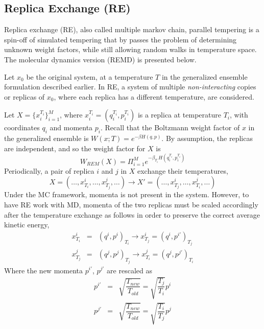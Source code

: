 \documentclass[12pt]{article}
\numberwithin{equation}{subsection}
\begin{document}
\begin{spacing}{1}
\subsection{Replica Exchange (RE)}
Replica exchange (RE), also called multiple markov chain, parallel tempering is a spin-off of simulated tempering that by passes the problem of determining unknown weight factors, while still allowing random walks in temperature space. The molecular dynamics version (REMD) is presented below.  

Let $x_0$ be the original system, at a temperature $T$ in the generalized ensemble formulation described earlier.  In RE, a system of multiple \textit{non-interacting} copies or replicas of $x_0$, where each replica has a different temperature, are considered. 

Let $X=\{x_i^{T_i}\}_{i=1}^{M}$, where $x_i^{T_i}=(q_i^{T_i},p_i^{T_i})$ is a replica at temperature $T_i$, with coordinates $q_i$ and momenta $p_i$.  Recall that the Boltzmann weight factor of $x$ in the generalized ensemble is $W(x;T)=e^{-\beta H(q,p)}$.  By assumption, the replicas are independent, and so the weight factor for $X$ is 
\begin{equation} \label{RE_weight}
W_{REM}(X) = \Pi_{i=1}^{M} e^{-\beta_{T_i} H(q_i^{T_i}, p_i^{T_i})}
\end{equation}
Periodically, a pair of replica $i$ and $j$ in $X$ exchange their temperatures, 
\begin{equation}
X=(\ldots,x_{T_i}^i,\ldots,x_{T_j}^j,\ldots) \longrightarrow X'=(\ldots,x_{T_j}^i, \ldots,x_{T_i}^j,\ldots)
\end{equation}
Under the MC framework, momenta is not present in the system. However, to have RE work with MD, momenta of the two replicas must be scaled accordingly after the temperature exchange as follows in order to preserve the correct average kinetic energy,
\begin{eqnarray}
	x_{T_i}^i &=& (q^i,p^i)_{T_i} \longrightarrow x_{T_j}^i = (q^i,p^{i'})_{T_j}\\
	x_{T_j}^j &=& (q^j,p^j)_{T_j} \longrightarrow x_{T_i}^j = (q^j,p^{j'})_{T_i}
\end{eqnarray}
Where the new momenta $p^{i'}$, $p^{j'}$ are rescaled as 
\begin{eqnarray}
	p^{i'} &=& \sqrt{\dfrac{T_{new}}{T_{old}}} = \sqrt{\dfrac{T_j}{T_i}}p^i\\
	p^{j'} &=& \sqrt{\dfrac{T_{new}}{T_{old}}} = \sqrt{\dfrac{T_i}{T_j}}p^j

\end{eqnarray}
\end{spacing}
\end{document}
